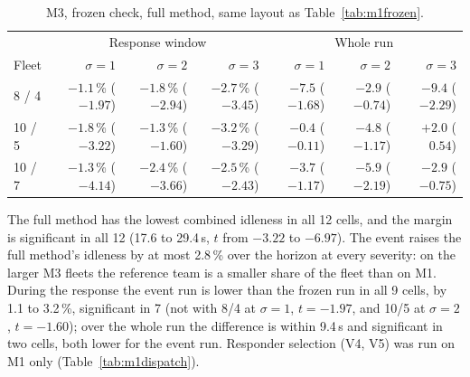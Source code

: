 \documentclass[11pt]{article}
\theoremstyle{definition}
\theoremstyle{plain}
\begin{document}
\begin{table}[H]
\centering
\small
\caption{M3, frozen check, full method, same layout as Table~\ref{tab:m1frozen}.}
\label{tab:m3frozen}
\setlength{\tabcolsep}{3pt}
\begin{tabular}{lrrrrrr}
\toprule
& \multicolumn{3}{c}{Response window} & \multicolumn{3}{c}{Whole run} \\
Fleet & $\sigma = 1$ & $\sigma = 2$ & $\sigma = 3$ & $\sigma = 1$ & $\sigma = 2$ & $\sigma = 3$ \\
\midrule
8 / 4 & $-1.1$\,\% ($-1.97$) & $-1.8$\,\% ($-2.94$) & $-2.7$\,\% ($-3.45$) & $-7.5$ ($-1.68$) & $-2.9$ ($-0.74$) & $-9.4$ ($-2.29$) \\
10 / 5 & $-1.8$\,\% ($-3.22$) & $-1.3$\,\% ($-1.60$) & $-3.2$\,\% ($-3.29$) & $-0.4$ ($-0.11$) & $-4.8$ ($-1.17$) & $+2.0$ ($0.54$) \\
10 / 7 & $-1.3$\,\% ($-4.14$) & $-2.4$\,\% ($-3.66$) & $-2.5$\,\% ($-2.43$) & $-3.7$ ($-1.17$) & $-5.9$ ($-2.19$) & $-2.9$ ($-0.75$) \\
\bottomrule
\end{tabular}
\end{table}

The full method has the lowest combined idleness in all 12 cells, and the
margin is significant in all 12 (17.6 to 29.4\,s, $t$ from $-3.22$ to
$-6.97$). The event raises the full method's idleness by at most 2.8\,\%
over the horizon at every severity: on the larger M3 fleets the reference
team is a smaller share of the fleet than on M1. During the response the
event run is lower than the frozen run in all 9 cells, by 1.1 to 3.2\,\%,
significant in 7 (not with 8/4 at $\sigma = 1$, $t = -1.97$, and 10/5 at
$\sigma = 2$, $t = -1.60$); over the whole run the difference is within
9.4\,s and significant in two cells, both lower for the event run.
Responder selection (V4, V5) was run on M1 only
(Table~\ref{tab:m1dispatch}).
\end{document}
